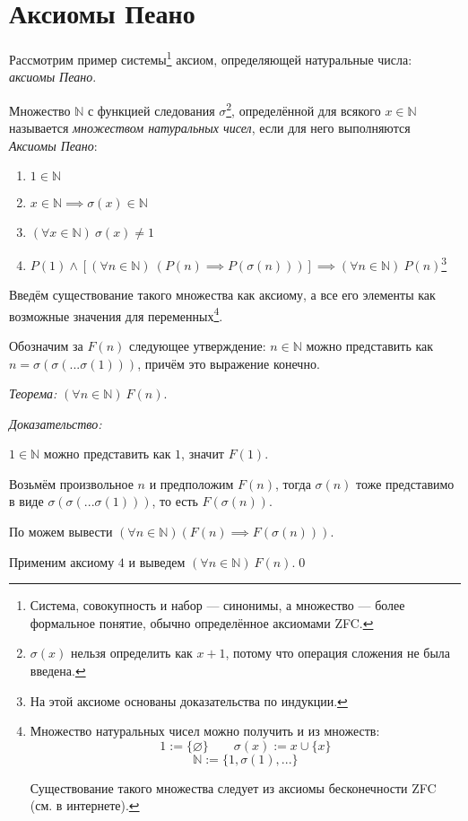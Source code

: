 \section{Аксиомы Пеано}

Рассмотрим пример системы\footnote{
	Система, совокупность и набор --- синонимы, а множество --- более формальное
	понятие, обычно определённое аксиомами ZFC.
} аксиом, определяющей натуральные числа: {\it аксиомы Пеано}.

\newcommand\N{\mathbb{N}}
Множество $\N$ с функцией следования $\sigma$\footnote{$\sigma(x)$ нельзя определить
	как $x+1$, потому что операция сложения не была введена.},
определённой для всякого $x\in\N$
называется {\it множеством натуральных чисел}, если для него
выполняются {\it Аксиомы Пеано}:
\begin{enumerate}
	\item{}$1\in \N$
	\item{}$x\in\N\implies \sigma(x)\in\N$
	\item{}$(\forall x\in\N)~\sigma(x)\neq 1$
	\item{}$P(1)\land [(\forall n\in\N)~(P(n)\implies P(\sigma(n)))]
		\implies(\forall n\in\N)~P(n)$\footnote{На этой аксиоме основаны
		доказательства по индукции.}
\end{enumerate}

Введём существование такого множества как аксиому, а
все его элементы как
возможные значения для переменных\footnote{Множество натуральных чисел можно
	получить и из множеств:
	\[
		1:=\{\varnothing\}\qquad\sigma(x):=x\cup \{x\}
	\]
	\[
		\N:=\{1,\sigma(1),...\}
	\]

	Существование такого множества следует из
	аксиомы бесконечности ZFC (см. в интернете).}.

Обозначим за $F(n)$ следующее утверждение: ${n\in\N}$ можно представить как
$n=\sigma(\sigma(...\sigma(1)))$, причём это выражение конечно.

{\it Теорема:} $(\forall n\in\N)~F(n)$.

	{\it Доказательство:}

$1\in\N$ можно представить как $1$, значит $F(1)$.

Возьмём произвольное $n$ и предположим $F(n)$, тогда $\sigma(n)$ тоже
представимо в виде $\sigma(\sigma(...\sigma(1)))$, то есть $F(\sigma(n))$.

По \Aii{} можем вывести $(\forall n\in\N)(F(n)\implies F(\sigma(n)))$.

Применим аксиому $4$ и выведем $(\forall n\in\N)~F(n)$.\qed


